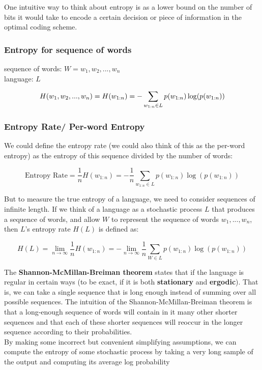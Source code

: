 One intuitive way to think about entropy is as a lower bound on the number of bits it would take to encode a certain decision or piece of information in the optimal coding scheme.

\subsubsection{Entropy for sequence of words}\label{Entropy for sequence of words}
sequence of words: $W = {w_1,w_2,...,w_n}$\\
language: $L$

\[
    H(w_1,w_2,...,w_n) = H(w_{1:n}) = -\displaystyle\sum_{w_{1:n}\in L} p(w_{1:n})\log(p(w_{1:n}))
\]

\subsubsection{Entropy Rate/ Per-word Entropy}
We could define the entropy rate (we could also think of this as the per-word entropy) as the entropy of this sequence divided by the number of words:

\[
    \text{Entropy Rate} = \displaystyle\dfrac{1}{n}H(w_{1:n}) = -\displaystyle\dfrac{1}{n}\sum_{w_{1:n}\in L} p(w_{1:n})\log(p(w_{1:n}))
\]

But to measure the true entropy of a language, we need to consider sequences of infinite length. If we think of a language as a stochastic process $L$ that produces a sequence of words, and allow $W$ to represent the sequence of words $w_1,...,w_n$, then $L$’s entropy rate $H(L)$ is defined as:

\[
    H(L) = \lim_{n \rightarrow \infty} \displaystyle\dfrac{1}{n}H(w_{1:n}) = -\lim_{n \rightarrow \infty} \displaystyle\dfrac{1}{n}\sum_{W \in L} p(w_{1:n})\log(p(w_{1:n}))
\]

The \textbf{Shannon-McMillan-Breiman theorem} states that if the language is regular in certain ways (to be exact, if it is both \textbf{stationary} and \textbf{ergodic}). That is, we can take a single sequence that is long enough instead of summing over all possible sequences. The intuition of the Shannon-McMillan-Breiman theorem is that a long-enough sequence of words will contain in it many other shorter sequences and that each of these shorter sequences will reoccur in the longer sequence according to their probabilities.\\By making some incorrect but convenient simplifying assumptions, we can compute the entropy of some stochastic process by taking a very long sample of the output and computing its average log probability

